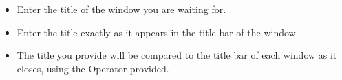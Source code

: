 \begin{itemize}
\item Enter the title of the window you are waiting for. 
\item Enter the title exactly as it appears in the title bar of the window.
\item The title you provide will be compared to the title bar of each window as it closes, using the Operator provided.
\end{itemize}

